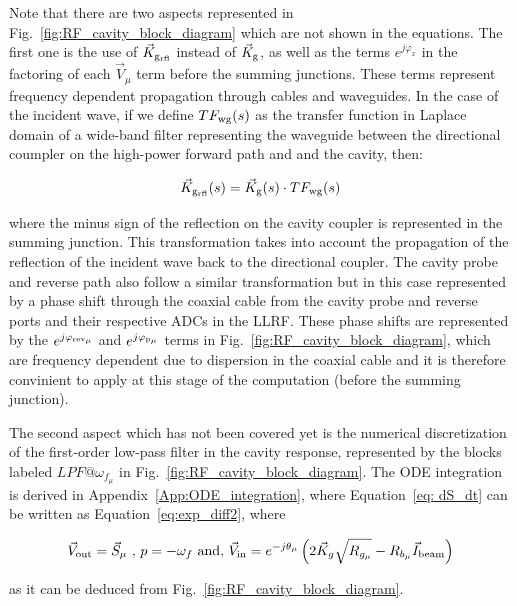 \documentclass[a4paper,12pt]{article}
\begin{document}
Note that there are two aspects represented in Fig.~\ref{fig:RF_cavity_block_diagram} which are not shown in the equations. The first one is the use of $\vec K_{\rm g_{rfl}}$ instead of $\vec K_{\rm g}$, as well as the terms $e^{j\varphi_{x}}$ in the factoring of each $\vec V_\mu$ term before the summing junctions. These terms represent frequency dependent propagation through cables and waveguides. In the case of the incident wave, if we define $TF_{\rm wg}(s)$ as the transfer function in Laplace domain of a wide-band filter representing the waveguide between the directional coumpler on the high-power forward path and and the cavity, then:

\begin{equation}
 \vec K_{\rm g_{rfl}}(s) = \vec K_{\rm g}(s) \cdot TF_{\rm wg}(s)
\end{equation}

\noindent where the minus sign of the reflection on the cavity coupler is represented in the summing junction. This transformation takes into account the propagation of the reflection of the incident wave back to the directional coupler.
The cavity probe and reverse path also follow a similar transformation but in this case represented by a phase shift through the coaxial cable from the cavity probe and reverse ports and their respective ADCs in the LLRF. These phase shifts are represented by the $e^{j\varphi_{\rm rev_{\mu}}}$ and $e^{j\varphi_{\rm p_{\mu}}}$ terms in Fig.~\ref{fig:RF_cavity_block_diagram}, which are frequency dependent due to dispersion in the coaxial cable and it is therefore convinient to apply at this stage of the computation (before the summing junction).

The second aspect which has not been covered yet is the numerical discretization of the first-order low-pass filter in the cavity response, represented by the blocks labeled $LPF@\omega_{f_{\mu}}$ in Fig.~\ref{fig:RF_cavity_block_diagram}. The ODE integration is derived in Appendix~\ref{App:ODE_integration}, where Equation~\ref{eq: dS_dt} can be written as Equation~\ref{eq:exp_diff2}, where

\begin{equation}
 \vec V_{\rm out} = \vec S_{\mu} \mbox{ , } p = -\omega_f \mbox{ and, } \vec V_{\rm in} = e^{-j\theta_{\mu}} \left(2\vec{K}_g\sqrt{R_{g_{\mu}}} - R_{b_{\mu}}\vec{I}_{\rm beam}\right)
\end{equation}

\noindent as it can be deduced from Fig.~\ref{fig:RF_cavity_block_diagram}. 
\end{document}
